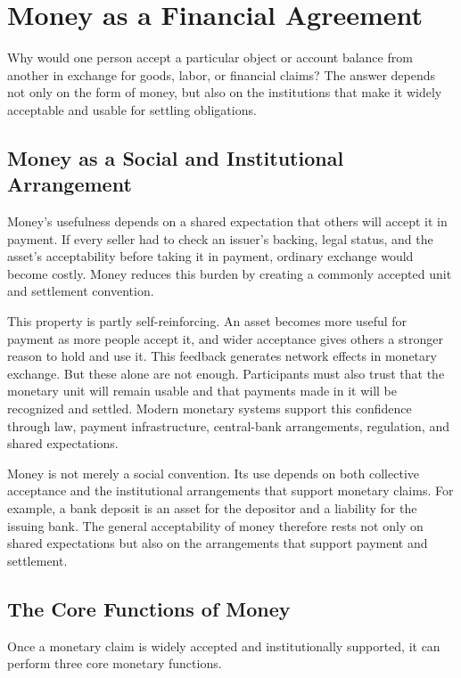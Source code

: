 \section{Money as a Financial Agreement}

Why would one person accept a particular object or account balance from another in exchange for goods, labor, or financial claims? The answer depends not only on the form of money, but also on the institutions that make it widely acceptable and usable for settling obligations. 

\subsection{Money as a Social and Institutional Arrangement}

Money's usefulness depends on a shared expectation that others will accept it in payment. If every seller had to check an issuer's backing, legal status, and the asset's acceptability before taking it in payment, ordinary exchange would become costly. Money reduces this burden by creating a commonly accepted unit and settlement convention.

This property is partly self-reinforcing. An asset becomes more useful for payment as more people accept it, and wider acceptance gives others a stronger reason to hold and use it. This feedback generates network effects in monetary exchange. But these alone are not enough. Participants must also trust that the monetary unit will remain usable and that payments made in it will be recognized and settled.
Modern monetary systems support this confidence through law, payment infrastructure, central-bank arrangements, regulation, and shared expectations. 

Money is not merely a social convention. Its use depends on both collective acceptance and the institutional arrangements that support monetary claims. For example, a bank deposit is an asset for the depositor and a liability for the issuing bank. The general acceptability of money therefore rests not only on shared expectations but also on the arrangements that support payment and settlement.

\subsection{The Core Functions of Money}

Once a monetary claim is widely accepted and institutionally supported, it can perform three core monetary functions.

